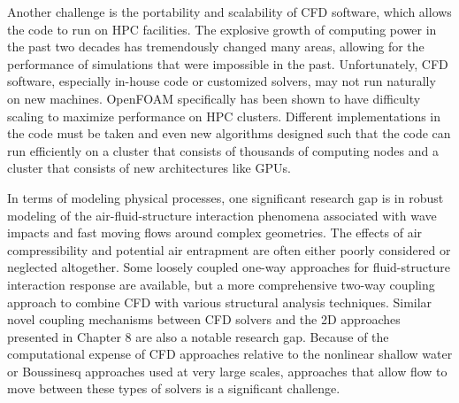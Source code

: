 Another challenge is the portability and scalability of CFD software, which allows the code to run on HPC facilities. The explosive growth of computing power in the past two decades has tremendously changed many areas, allowing for the performance of simulations that were impossible in the past. Unfortunately, CFD software, especially in-house code or customized solvers, may not run naturally on new machines.  OpenFOAM specifically has been shown to have difficulty scaling to maximize performance on HPC clusters. Different implementations in the code must be taken and even new algorithms designed such that the code can run efficiently on a cluster that consists of thousands of computing nodes and a cluster that consists of new architectures like GPUs.

In terms of modeling physical processes, one significant research gap is in robust modeling of the air-fluid-structure interaction phenomena associated with wave impacts and fast moving flows around complex geometries.  The effects of air compressibility and potential air entrapment are often either poorly considered or neglected altogether.  Some loosely coupled one-way approaches for fluid-structure interaction response are available, but a more comprehensive two-way coupling approach to combine CFD with various structural analysis techniques.  Similar novel coupling mechanisms between CFD solvers and the 2D approaches presented in Chapter 8 are also a notable research gap.  Because of the computational expense of CFD approaches relative to the nonlinear shallow water or Boussinesq approaches used at very large scales, approaches that allow flow to move between these types of solvers is a significant challenge.